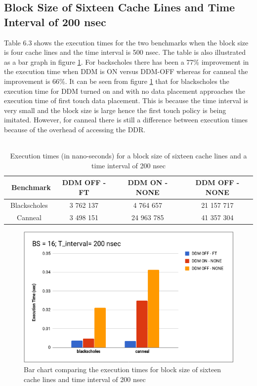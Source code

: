 \documentclass{listhesis}
\begin{document}
\subsection{Block Size of Sixteen Cache Lines and Time Interval of 200 nsec}
Table 6.3 shows the execution times for the two benchmarks when the block size is four cache lines and the time interval is 500 nsec. The table is also illustrated as a bar graph in figure \ref{fig:BS_16_T_200.png}. For backscholes there has been a 77\% improvement in the execution time when DDM is ON versus DDM-OFF whereas for canneal the improvement is 66\%. It can be seen from figure \ref{fig:BS_16_T_200.png} that for blackscholes the execution time for DDM turned on and with no data placement approaches the execution time of first touch data placement. This is because the time interval is very small and the block size is large hence the first touch policy is being imitated. However, for canneal there is still a difference between execution times because of the overhead of accessing the DDR. \\
\\
\begin{table}[h!]
\begin{center}
 \begin{tabular}{|| c | c | c | c||} 
 \hline
 \ \textbf{Benchmark} & \textbf{DDM OFF - FT}  & \textbf{DDM ON - NONE}  & \textbf{DDM OFF - NONE}\\ [0.5 ex] 
 \hline\hline
  Blackscholes   &   3 762 137   &   4 764 657	    &  21 157 717 \\ 
 \hline
   Canneal  	&   3 498 151    &   24 963 785   	&   41 357 304   \\
 \hline
\end{tabular}
 \caption{Execution times (in nano-seconds) for a block size of sixteen cache lines and a time interval of 200 nsec}
 \label{table:ExecTimes3}
\end{center}
\end{table}

\begin{figure}
  \includegraphics[width=\linewidth]{BS_16_T_200.png}
  \centering
  \caption{Bar chart comparing the execution times for block size of sixteen cache lines and time interval of 200 nsec}
  \label{fig:BS_16_T_200.png}
\end{figure}
\end{document}
